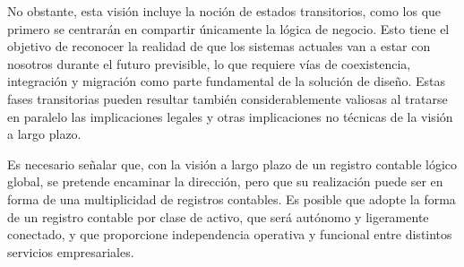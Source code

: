\documentclass{article}
\begin{document}
No obstante, esta visión incluye la noción de estados transitorios, como los que primero se centrarán en compartir únicamente la lógica de negocio. Esto tiene el objetivo de reconocer la realidad de que los sistemas actuales van a estar con nosotros durante el futuro previsible, lo que requiere vías de coexistencia, integración y migración como parte fundamental de la solución de diseño. Estas fases transitorias pueden resultar también considerablemente valiosas al tratarse en paralelo las implicaciones legales y otras implicaciones no técnicas de la visión a largo plazo.

Es necesario señalar que, con la visión a largo plazo de un registro contable lógico global, se pretende encaminar la dirección, pero que su realización puede ser en forma de una multiplicidad de registros contables. Es posible que adopte la forma de un registro contable por clase de activo, que será autónomo y ligeramente conectado, y que proporcione independencia operativa y funcional entre distintos servicios empresariales. 
\end{document}
